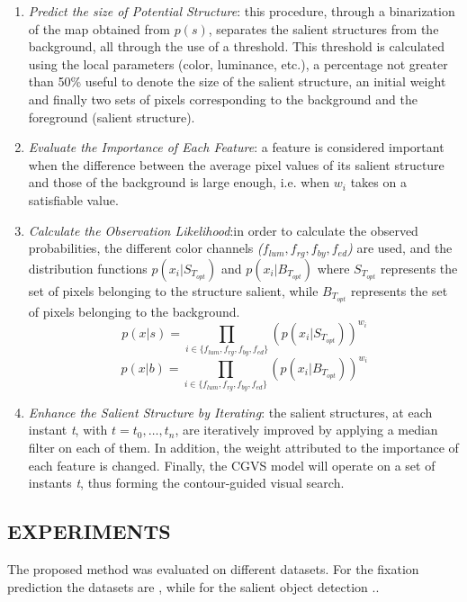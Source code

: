\begin{enumerate}
    \item \emph{Predict the size of Potential Structure}: this procedure, through a binarization of the map obtained 
    from $ p(s) $, separates the salient structures from the background, all 
    through the use of a threshold. This threshold is calculated using the 
    local parameters (color, luminance, etc.), a percentage not greater than 
    50\% useful to denote the size of the salient structure, an initial weight 
    and finally two sets of pixels corresponding to the background and the 
    foreground (salient structure).
    \item \emph{Evaluate the Importance of Each Feature}: a feature is considered important 
    when the difference between the average pixel values of its 
    salient structure and those of the background is large enough, i.e. when \emph{$ w_i $} 
    takes on a satisfiable value.
    \item \emph{Calculate the Observation Likelihood}:in order to calculate the observed 
    probabilities, the different color channels \emph{($ f_{lum}, f_{rg}, f_{by}, f_{ed} $)} are used, 
    and the distribution functions $ p(x_i | S_{T_{opt}}) $ and $ p(x_i | B_{T_{opt}}) $ where $ S_{T_{opt}} $ 
    represents the set of pixels belonging to the structure salient, while 
    $ B_{T_{opt}} $ represents the set of pixels belonging to the background.
    $$ p(x|s) = \prod_{i \in {\{} f_{lum}, f_{rg}, f_{by}, f_{ed} {\}}} {(p(x_i | S_{T_{opt}}))^{w_i}} $$
    $$ p(x|b) = \prod_{i \in {\{} f_{lum}, f_{rg}, f_{by}, f_{ed} {\}}} {(p(x_i | B_{T_{opt}}))^{w_i}} $$
    \item \emph{Enhance the Salient Structure by Iterating}: the salient structures, at 
    each instant \emph{t}, with $ t = t_0,…, t_n $, are iteratively improved by applying 
    a median filter on each of them. In addition, the weight attributed to 
    the importance of each feature is changed. Finally, the CGVS model 
    will operate on a set of instants \emph{t}, thus forming the contour-guided 
    visual search.
\end{enumerate}

\subsection{EXPERIMENTS}
The proposed method was evaluated on different datasets. For the fixation 
prediction the datasets are \cite{0747815530} \cite{0747815531} \cite{0747815579}, while for the salient object detection ..



